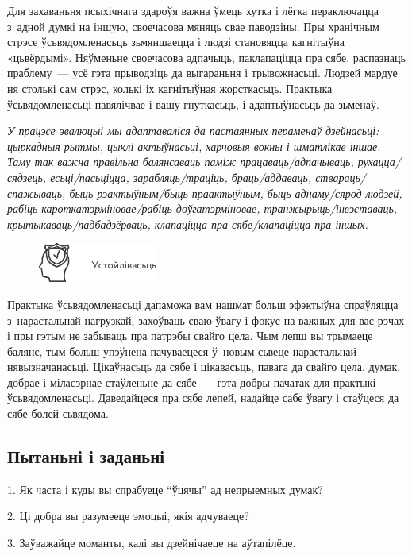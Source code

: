 Для захаваньня псыхічнага здароўя важна ўмець хутка і лёгка пераключацца з~адной думкі на іншую, своечасова мяняць свае паводзіны. Пры хранічным стрэсе ўсьвядомленасьць зьмяншаецца і людзі становяцца кагнітыўна «цьвёрдымі». Няўменьне своечасова адпачыць, паклапаціцца пра сябе, распазнаць праблему~--- усё гэта прыводзіць да выгараньня і трывожнасьці. Людзей мардуе ня столькі сам стрэс, колькі іх кагнітыўная жорсткасьць. Практыка ўсьвядомленасьці павялічвае і вашу гнуткасьць, і адаптыўнасьць да зьменаў.

\emph{У працэсе эвалюцыі мы адаптаваліся да пастаянных пераменаў дзейнасьці: цыркадныя рытмы, цыклі актыўнасьці, харчовыя вокны і шматлікае іншае. Таму так важна правільна балянсаваць паміж працаваць/адпачываць, рухацца/сядзець, есьці/пасьціцца, зарабляць/траціць, браць/аддаваць, ствараць/спажываць, быць рэактыўным/быць праактыўным, быць аднаму/сярод людзей, рабіць кароткатэрміновае/рабіць доўгатэрміновае, транжырыць/інвэставаць, крытыкаваць/падбадзёрваць, клапаціцца пра сябе/клапаціцца пра іншых.}

\begin{figure}[htb!]
  \centering
  \includegraphics[scale=1.5]{willpower/ch8/2.pdf}
\end{figure}

Практыка ўсьвядомленасьці дапаможа вам нашмат больш эфэктыўна спраўляцца з~нарастальнай нагрузкай, захоўваць сваю ўвагу і фокус на важных для вас рэчах і пры гэтым не забываць пра патрэбы свайго цела. Чым лепш вы трымаеце балянс, тым больш упэўнена пачуваецеся ў~новым сьвеце нарастальнай нявызначанасьці. Цікаўнасьць да сябе і цікавасьць, павага да свайго цела, думак, добрае і міласэрнае стаўленьне да сябе~--- гэта добры пачатак для практыкі ўсьвядомленасьці. Даведайцеся пра сябе лепей, надайце сабе ўвагу і стаўцеся да сябе болей сьвядома.

\subsection*{Пытаньні і заданьні}

1. Як часта і куды вы спрабуеце ``ўцячы'' ад непрыемных думак?

2. Ці добра вы разумееце эмоцыі, якія адчуваеце?

3. Заўважайце моманты, калі вы дзейнічаеце на аўтапілёце.


